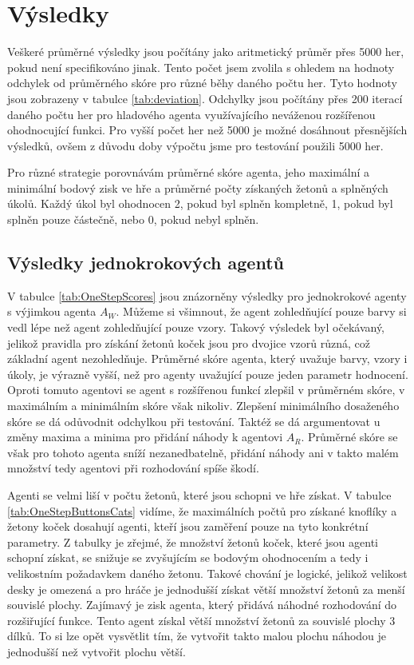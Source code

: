 \chapter{Výsledky}

Veškeré průměrné výsledky jsou počítány jako aritmetický průměr přes 5000 her, pokud není specifikováno jinak. Tento počet jsem zvolila s ohledem na hodnoty odchylek od průměrného skóre pro různé běhy daného počtu her. Tyto hodnoty jsou zobrazeny v tabulce \ref{tab:deviation}. Odchylky jsou počítány přes 200 iterací daného počtu her pro hladového agenta využívajícího neváženou rozšířenou ohodnocující funkci. Pro vyšší počet her než 5000 je možné dosáhnout přesnějších výsledků, ovšem z důvodu doby výpočtu jsme pro testování použili 5000 her.

\tableDeviation

Pro různé strategie porovnávám průměrné skóre agenta, jeho maximální a minimální bodový zisk ve hře a průměrné počty získaných žetonů a splněných úkolů. Každý úkol byl ohodnocen 2, pokud byl splněn kompletně, 1, pokud byl splněn pouze částečně, nebo 0, pokud nebyl splněn.


\section{Výsledky jednokrokových agentů}

V tabulce \ref{tab:OneStepScores} jsou znázorněny výsledky pro jednokrokové agenty s výjimkou agenta $A_{W}$. Můžeme si všimnout, že agent zohledňující pouze barvy si vedl lépe než agent zohledňující pouze vzory. Takový výsledek byl očekávaný, jelikož pravidla pro získání žetonů koček jsou pro dvojice vzorů různá, což základní agent nezohledňuje. Průměrné skóre agenta, který uvažuje barvy, vzory i úkoly, je výrazně vyšší, než pro agenty uvažující pouze jeden parametr hodnocení. Oproti tomuto agentovi se agent s rozšířenou funkcí zlepšil v průměrném skóre, v maximálním a minimálním skóre však nikoliv. Zlepšení minimálního dosaženého skóre se dá odůvodnit odchylkou při testování. Taktéž se dá argumentovat u změny maxima a minima pro přidání náhody k agentovi $A_R$. Průměrné skóre se však pro tohoto agenta sníží nezanedbatelně, přidání náhody ani v takto malém množství tedy agentovi při rozhodování spíše škodí.

\tableOneStepAgentsScore

Agenti se velmi liší v počtu žetonů, které jsou schopni ve hře získat. V tabulce \ref{tab:OneStepButtonsCats} vidíme, že maximálních počtů pro získané knoflíky a žetony koček dosahují agenti, kteří jsou zaměření pouze na tyto konkrétní parametry. Z tabulky je zřejmé, že množství žetonů koček, které jsou agenti schopní získat, se snižuje se zvyšujícím se bodovým ohodnocením a tedy i velikostním požadavkem daného žetonu. Takové chování je logické, jelikož velikost desky je omezená a pro hráče je jednodušší získat větší množství žetonů za menší souvislé plochy. Zajímavý je zisk agenta, který přidává náhodné rozhodování do rozšiřující funkce. Tento agent získal větší množství žetonů za souvislé plochy 3 dílků. To si lze opět vysvětlit tím, že vytvořit takto malou plochu náhodou je jednodušší než vytvořit plochu větší.


